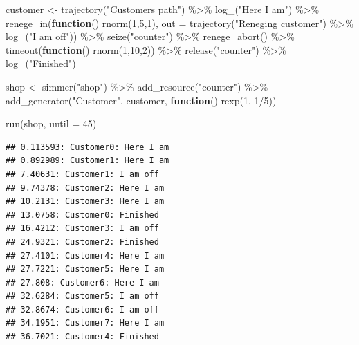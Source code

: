\documentclass[
]{book}
\newenvironment{Shaded}{\begin{snugshade}}{\end{snugshade}}
\newcommand{\AttributeTok}[1]{\textcolor[rgb]{0.77,0.63,0.00}{#1}}
\newcommand{\ControlFlowTok}[1]{\textcolor[rgb]{0.13,0.29,0.53}{\textbf{#1}}}
\newcommand{\DecValTok}[1]{\textcolor[rgb]{0.00,0.00,0.81}{#1}}
\newcommand{\FunctionTok}[1]{\textcolor[rgb]{0.00,0.00,0.00}{#1}}
\newcommand{\NormalTok}[1]{#1}
\newcommand{\OtherTok}[1]{\textcolor[rgb]{0.56,0.35,0.01}{#1}}
\newcommand{\SpecialCharTok}[1]{\textcolor[rgb]{0.00,0.00,0.00}{#1}}
\newcommand{\StringTok}[1]{\textcolor[rgb]{0.31,0.60,0.02}{#1}}
\begin{document}
\begin{Shaded}
\begin{Highlighting}[]
\NormalTok{customer }\OtherTok{\textless{}{-}}
  \FunctionTok{trajectory}\NormalTok{(}\StringTok{"Customer\textquotesingle{}s path"}\NormalTok{) }\SpecialCharTok{\%\textgreater{}\%}
  \FunctionTok{log\_}\NormalTok{(}\StringTok{"Here I am"}\NormalTok{) }\SpecialCharTok{\%\textgreater{}\%}
  \FunctionTok{renege\_in}\NormalTok{(}\ControlFlowTok{function}\NormalTok{() }\FunctionTok{rnorm}\NormalTok{(}\DecValTok{1}\NormalTok{,}\DecValTok{5}\NormalTok{,}\DecValTok{1}\NormalTok{),}
            \AttributeTok{out =} \FunctionTok{trajectory}\NormalTok{(}\StringTok{"Reneging customer"}\NormalTok{) }\SpecialCharTok{\%\textgreater{}\%}
              \FunctionTok{log\_}\NormalTok{(}\StringTok{"I am off"}\NormalTok{)) }\SpecialCharTok{\%\textgreater{}\%}
  \FunctionTok{seize}\NormalTok{(}\StringTok{"counter"}\NormalTok{) }\SpecialCharTok{\%\textgreater{}\%}
  \FunctionTok{renege\_abort}\NormalTok{() }\SpecialCharTok{\%\textgreater{}\%}
  \FunctionTok{timeout}\NormalTok{(}\ControlFlowTok{function}\NormalTok{() }\FunctionTok{rnorm}\NormalTok{(}\DecValTok{1}\NormalTok{,}\DecValTok{10}\NormalTok{,}\DecValTok{2}\NormalTok{)) }\SpecialCharTok{\%\textgreater{}\%}
  \FunctionTok{release}\NormalTok{(}\StringTok{"counter"}\NormalTok{) }\SpecialCharTok{\%\textgreater{}\%}
   \FunctionTok{log\_}\NormalTok{(}\StringTok{"Finished"}\NormalTok{)}

\NormalTok{shop }\OtherTok{\textless{}{-}}
  \FunctionTok{simmer}\NormalTok{(}\StringTok{"shop"}\NormalTok{) }\SpecialCharTok{\%\textgreater{}\%}
  \FunctionTok{add\_resource}\NormalTok{(}\StringTok{"counter"}\NormalTok{) }\SpecialCharTok{\%\textgreater{}\%}
  \FunctionTok{add\_generator}\NormalTok{(}\StringTok{"Customer"}\NormalTok{, customer, }\ControlFlowTok{function}\NormalTok{() }\FunctionTok{rexp}\NormalTok{(}\DecValTok{1}\NormalTok{, }\DecValTok{1}\SpecialCharTok{/}\DecValTok{5}\NormalTok{))}

\FunctionTok{run}\NormalTok{(shop, }\AttributeTok{until =} \DecValTok{45}\NormalTok{)}
\end{Highlighting}
\end{Shaded}

\begin{verbatim}
## 0.113593: Customer0: Here I am
## 0.892989: Customer1: Here I am
## 7.40631: Customer1: I am off
## 9.74378: Customer2: Here I am
## 10.2131: Customer3: Here I am
## 13.0758: Customer0: Finished
## 16.4212: Customer3: I am off
## 24.9321: Customer2: Finished
## 27.4101: Customer4: Here I am
## 27.7221: Customer5: Here I am
## 27.808: Customer6: Here I am
## 32.6284: Customer5: I am off
## 32.8674: Customer6: I am off
## 34.1951: Customer7: Here I am
## 36.7021: Customer4: Finished
\end{verbatim}
\end{document}
